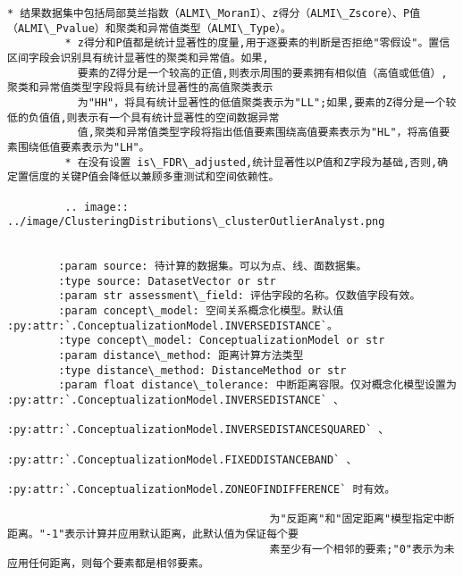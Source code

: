 \documentclass[11pt]{article}
\begin{document}
\begin{Verbatim}[commandchars=\\\{\}]
         * 结果数据集中包括局部莫兰指数（ALMI\_MoranI）、z得分（ALMI\_Zscore）、P值（ALMI\_Pvalue）和聚类和异常值类型（ALMI\_Type）。
         * z得分和P值都是统计显著性的度量,用于逐要素的判断是否拒绝"零假设"。置信区间字段会识别具有统计显著性的聚类和异常值。如果,
           要素的Z得分是一个较高的正值,则表示周围的要素拥有相似值（高值或低值）,聚类和异常值类型字段将具有统计显著性的高值聚类表示
           为"HH"，将具有统计显著性的低值聚类表示为"LL";如果,要素的Z得分是一个较低的负值值,则表示有一个具有统计显著性的空间数据异常
           值,聚类和异常值类型字段将指出低值要素围绕高值要素表示为"HL"，将高值要素围绕低值要素表示为"LH"。
         * 在没有设置 is\_FDR\_adjusted,统计显著性以P值和Z字段为基础,否则,确定置信度的关键P值会降低以兼顾多重测试和空间依赖性。
        
         .. image:: ../image/ClusteringDistributions\_clusterOutlierAnalyst.png
        
        
        :param source: 待计算的数据集。可以为点、线、面数据集。
        :type source: DatasetVector or str
        :param str assessment\_field: 评估字段的名称。仅数值字段有效。
        :param concept\_model: 空间关系概念化模型。默认值 :py:attr:`.ConceptualizationModel.INVERSEDISTANCE`。
        :type concept\_model: ConceptualizationModel or str
        :param distance\_method: 距离计算方法类型
        :type distance\_method: DistanceMethod or str
        :param float distance\_tolerance: 中断距离容限。仅对概念化模型设置为 :py:attr:`.ConceptualizationModel.INVERSEDISTANCE` 、
                                         :py:attr:`.ConceptualizationModel.INVERSEDISTANCESQUARED` 、
                                         :py:attr:`.ConceptualizationModel.FIXEDDISTANCEBAND` 、
                                         :py:attr:`.ConceptualizationModel.ZONEOFINDIFFERENCE` 时有效。
        
                                         为"反距离"和"固定距离"模型指定中断距离。"-1"表示计算并应用默认距离，此默认值为保证每个要
                                         素至少有一个相邻的要素;"0"表示为未应用任何距离，则每个要素都是相邻要素。
        

\end{Verbatim}
\end{document}
